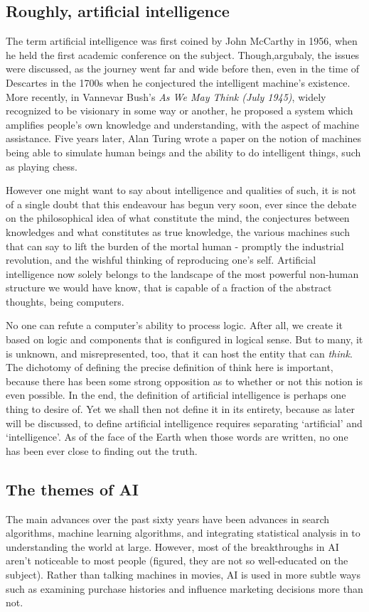 \subsection{Roughly, artificial intelligence}

The term artificial intelligence was first coined by John McCarthy in 1956, when he held the first academic conference on the subject. Though,argubaly, the issues were discussed, as the journey went far and wide before then, even in the time of Descartes in the 1700s when he conjectured the intelligent machine's existence. More recently, in Vannevar Bush's \textit{As We May Think (July 1945)}, widely recognized to be visionary in some way or another, he proposed a system which amplifies people's own knowledge and understanding, with the aspect of machine assistance. Five years later, Alan Turing wrote a paper on the notion of machines being able to simulate human beings and the ability to do intelligent things, such as playing chess. 

However one might want to say about intelligence and qualities of such, it is not of a single doubt that this endeavour has begun very soon, ever since the debate on the philosophical idea of what constitute the mind, the conjectures between knowledges and what constitutes as true knowledge, the various machines such that can say to lift the burden of the mortal human - promptly the industrial revolution, and the wishful thinking of reproducing one's self. Artificial intelligence now solely belongs to the landscape of the most powerful non-human structure we would have know, that is capable of a fraction of the abstract thoughts, being computers. 

No one can refute a computer's ability to process logic. After all, we create it based on logic and components that is configured in logical sense. But to many, it is unknown, and misrepresented, too, that it can host the entity that can \textit{think}. The dichotomy of defining the precise definition of think here is important, because there has been some strong opposition as to whether or not this notion is even possible. In the end, the definition of artificial intelligence is perhaps one thing to desire of. Yet we shall then not define it in its entirety, because as later will be discussed, to define artificial intelligence requires separating `artificial' and `intelligence'. As of the face of the Earth when those words are written, no one has been ever close to finding out the truth. 
\subsection{The themes of AI}
The main advances over the past sixty years have been advances in search algorithms, machine learning algorithms, and integrating statistical analysis in to understanding the world at large. However, most of the breakthroughs in AI aren't noticeable to most people (figured, they are not so well-educated on the subject). Rather than talking machines in movies, AI is used in more subtle ways such as examining purchase histories and influence marketing decisions more than not. 


